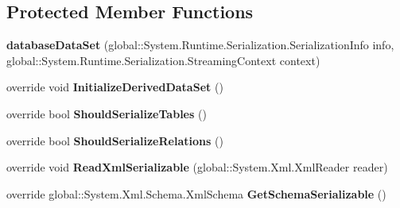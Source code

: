 \subsection*{Protected Member Functions}
\begin{DoxyCompactItemize}
\item 
\mbox{\label{classprojekt__grupowy_1_1database_data_set_ab74b74e969eca7357b0e7e329604751c}} 
{\bfseries database\+Data\+Set} (global\+::\+System.\+Runtime.\+Serialization.\+Serialization\+Info info, global\+::\+System.\+Runtime.\+Serialization.\+Streaming\+Context context)
\item 
\mbox{\label{classprojekt__grupowy_1_1database_data_set_a3380af4a4b85afe3bea2af279a5d376e}} 
override void {\bfseries Initialize\+Derived\+Data\+Set} ()
\item 
\mbox{\label{classprojekt__grupowy_1_1database_data_set_a053cf03aacbe58e75a0d6e2907bf6e57}} 
override bool {\bfseries Should\+Serialize\+Tables} ()
\item 
\mbox{\label{classprojekt__grupowy_1_1database_data_set_ab57bb45894f4bd66c2e21dbcf547458e}} 
override bool {\bfseries Should\+Serialize\+Relations} ()
\item 
\mbox{\label{classprojekt__grupowy_1_1database_data_set_aa51deb6ae3ffc7beb179d57ee46c6712}} 
override void {\bfseries Read\+Xml\+Serializable} (global\+::\+System.\+Xml.\+Xml\+Reader reader)
\item 
\mbox{\label{classprojekt__grupowy_1_1database_data_set_a246b77ef48cbef7fc969c08b36b3155f}} 
override global\+::\+System.\+Xml.\+Schema.\+Xml\+Schema {\bfseries Get\+Schema\+Serializable} ()
\end{DoxyCompactItemize}
